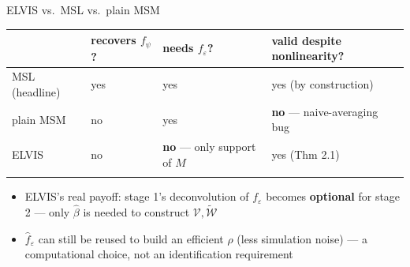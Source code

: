 \documentclass[
  ignorenonframetext,
  aspectratio=169,
]{beamer}
\newcounter{none} %
\providecommand{\tightlist}{%
  \setlength{\itemsep}{0pt}\setlength{\parskip}{0pt}}
\begin{document}
\begin{frame}{ELVIS vs.~MSL vs.~plain MSM}
\protect{}\label{elvis-vs.-msl-vs.-plain-msm}
{\def\LTcaptype{none} %
\begin{longtable}[]{@{}
  >{\raggedright\arraybackslash}p{}
  >{\raggedright\arraybackslash}p{}
  >{\raggedright\arraybackslash}p{}
  >{\raggedright\arraybackslash}p{}@{}}
\toprule\noalign{}
\begin{minipage}[b]{\linewidth}\raggedright
\end{minipage} & \begin{minipage}[b]{\linewidth}\raggedright
recovers \(f_\psi\)?
\end{minipage} & \begin{minipage}[b]{\linewidth}\raggedright
needs \(f_\varepsilon\)?
\end{minipage} & \begin{minipage}[b]{\linewidth}\raggedright
valid despite nonlinearity?
\end{minipage} \\
\midrule\noalign{}
\endhead
MSL (headline) & yes & yes & yes (by construction) \\
plain MSM & no & yes & \textbf{no} --- naive-averaging bug \\
ELVIS & no & \textbf{no} --- only support of \(M\) & yes (Thm 2.1) \\
\bottomrule\noalign{}
\end{longtable}
}

\begin{itemize}
\tightlist
\item
  ELVIS's real payoff: stage 1's deconvolution of \(f_\varepsilon\)
  becomes \textbf{optional} for stage 2 --- only \(\hat\beta\) is needed
  to construct \(\mathcal V,\tilde{\mathcal W}\)
\item
  \(\hat f_\varepsilon\) can still be reused to build an efficient
  \(\rho\) (less simulation noise) --- a computational choice, not an
  identification requirement
\end{itemize}
\end{frame}
\end{document}
